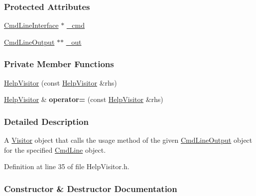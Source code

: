 \subsubsection*{Protected Attributes}
\begin{DoxyCompactItemize}
\item 
\hyperlink{classTCLAP_1_1CmdLineInterface}{Cmd\+Line\+Interface} $\ast$ \hyperlink{classTCLAP_1_1HelpVisitor_afc7e0402f4e09ab6eff91680ea87ea57}{\+\_\+cmd}
\item 
\hyperlink{classTCLAP_1_1CmdLineOutput}{Cmd\+Line\+Output} $\ast$$\ast$ \hyperlink{classTCLAP_1_1HelpVisitor_ae12c2d2208b64377a6360fb335454877}{\+\_\+out}
\end{DoxyCompactItemize}
\subsubsection*{Private Member Functions}
\begin{DoxyCompactItemize}
\item 
\hyperlink{classTCLAP_1_1HelpVisitor_a847527061ec9ef34758f85b445256b3f}{Help\+Visitor} (const \hyperlink{classTCLAP_1_1HelpVisitor}{Help\+Visitor} \&rhs)
\item 
\hyperlink{classTCLAP_1_1HelpVisitor}{Help\+Visitor} \& {\bfseries operator=} (const \hyperlink{classTCLAP_1_1HelpVisitor}{Help\+Visitor} \&rhs)\hypertarget{classTCLAP_1_1HelpVisitor_a04059ef68cc42eda0f786a892a853dd0}{}\label{classTCLAP_1_1HelpVisitor_a04059ef68cc42eda0f786a892a853dd0}

\end{DoxyCompactItemize}


\subsubsection{Detailed Description}
A \hyperlink{classTCLAP_1_1Visitor}{Visitor} object that calls the usage method of the given \hyperlink{classTCLAP_1_1CmdLineOutput}{Cmd\+Line\+Output} object for the specified \hyperlink{classTCLAP_1_1CmdLine}{Cmd\+Line} object. 

Definition at line 35 of file Help\+Visitor.\+h.



\subsubsection{Constructor \& Destructor Documentation}
